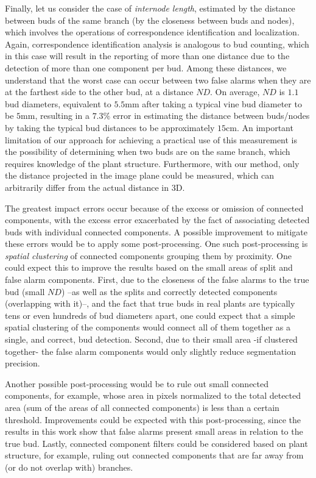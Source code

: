 \documentclass[a4paper,authoryear,review]{elsarticle}
\begin{document}
Finally, let us consider the case of \emph{internode length}, estimated by the distance between buds of the same branch (by the closeness between buds and nodes), which involves the operations of correspondence identification and localization. Again, correspondence identification analysis is analogous to bud counting, which in this case will result in the reporting of more than one distance due to the detection of more than one component per bud. Among these distances, we understand that the worst case can occur between two false alarms when they are at the farthest side to the other bud, at a distance $ND$. On average, $ND$ is $1.1$ bud diameters, equivalent to $5.5$mm after taking a typical vine bud diameter to be $5$mm, resulting in a $7.3\%$ error in estimating the distance between buds/nodes by taking the typical bud distances to be approximately $15$cm. 
%
An important limitation of our approach for achieving a practical use of this measurement is the possibility of determining when two buds are on the same branch, which requires knowledge of the plant structure. Furthermore, with our method, only the distance projected in the image plane could be measured, which can arbitrarily differ from the actual distance in 3D. 

The greatest impact errors occur because of the excess or omission of connected components, with the excess error exacerbated by the fact of associating detected buds with individual connected components. A possible improvement to mitigate these errors would be to apply some post-processing. 
%
One such post-processing is \emph{spatial clustering} of connected components grouping them by proximity. One could expect this to improve the results based on the small areas of split and false alarm components. First, due to the closeness of the false alarms to the true bud  (small $ND$) --as well as the splits and correctly detected components (overlapping with it)--,  and the fact that true buds in real plants are typically tens or even hundreds of bud diameters apart, one could expect that a simple spatial clustering of the components would connect all of them together as a single, and correct, bud detection. Second, due to their small area -if clustered together- the false alarm components would only slightly reduce segmentation precision.

Another possible post-processing would be to rule out small connected components, for example, whose area in pixels normalized to the total detected area (sum of the areas of all connected components) is less than a certain threshold. Improvements could be expected with this post-processing, since the results in this work show that false alarms present small areas in relation to the true bud. Lastly, connected component filters could be considered based on plant structure, for example, ruling out connected components that are far away from (or do not overlap with) branches.
\end{document}

